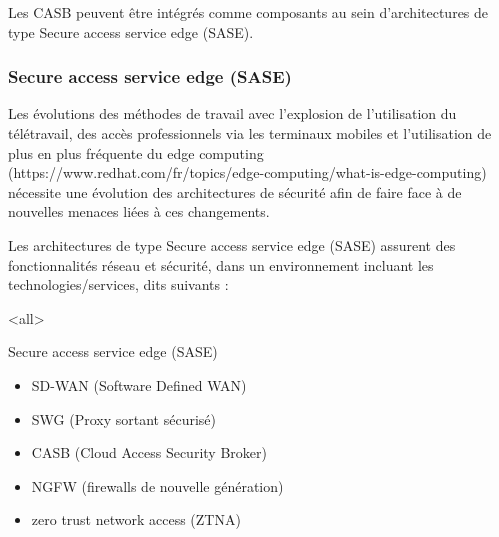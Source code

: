 Les CASB peuvent être intégrés comme composants au sein d'architectures de type Secure access service edge (SASE).

\subsubsection{Secure access service edge (SASE)}
Les évolutions des méthodes de travail avec l'explosion de l'utilisation du télétravail, des accès professionnels via les terminaux mobiles et l'utilisation de plus en plus fréquente du edge computing (https://www.redhat.com/fr/topics/edge-computing/what-is-edge-computing) nécessite une évolution des architectures de sécurité afin de faire face à de nouvelles menaces liées à ces changements.

Les architectures de type Secure access service edge (SASE) assurent des fonctionnalités réseau et sécurité, dans un environnement  incluant les technologies/services, dits  suivants :

\mode<all>{\texframe
{Secure access service edge (SASE)} %
{} %
{
\begin{itemize}
    \item SD-WAN (Software Defined WAN)
    \item SWG (Proxy sortant sécurisé)
    \item CASB (Cloud Access Security Broker)
    \item NGFW (firewalls de nouvelle génération)
    \item zero trust network access (ZTNA)
\end{itemize}
}}

